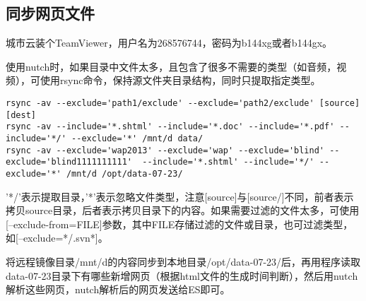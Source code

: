 \subsection{同步网页文件}
\par 城市云装个TeamViewer，用户名为268576744，密码为b144xg或者b144gx。
\par 使用nutch时，如果目录中文件太多，且包含了很多不需要的类型（如音频，视频），可使用rsync命令，保持源文件夹目录结构，同时只提取指定类型。
\begin{verbatim}
rsync -av --exclude='path1/exclude' --exclude='path2/exclude' [source] [dest]
rsync -av --include='*.shtml' --include='*.doc' --include='*.pdf' --include='*/' --exclude='*' /mnt/d data/
rsync -av --exclude='wap2013' --exclude='wap' --exclude='blind' --exclude='blind1111111111'  --include='*.shtml' --include='*/' --exclude='*' /mnt/d /opt/data-07-23/
\end{verbatim}
\par '*/'表示提取目录，'*'表示忽略文件类型，注意[source]与[source/]不同，前者表示拷贝source目录，后者表示拷贝目录下的内容。如果需要过滤的文件太多，可使用[--exclude-from=FILE]参数，其中FILE存储过滤的文件或目录，也可过滤类型，如[--exclude=*/.svn*]。
\par 将远程镜像目录/mnt/d的内容同步到本地目录/opt/data-07-23/后，再用程序读取data-07-23目录下有哪些新增网页（根据html文件的生成时间判断），然后用nutch解析这些网页，nutch解析后的网页发送给ES即可。
